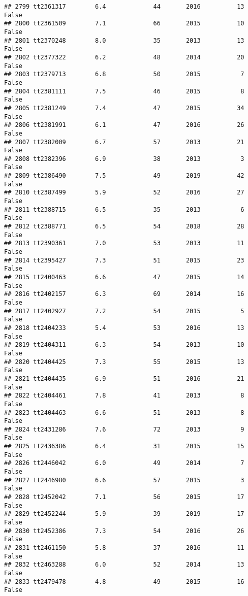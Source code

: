 \documentclass[
]{article}
\begin{document}
\begin{verbatim}
## 2799 tt2361317        6.4             44       2016          13   False
## 2800 tt2361509        7.1             66       2015          10   False
## 2801 tt2370248        8.0             35       2013          13   False
## 2802 tt2377322        6.2             48       2014          20   False
## 2803 tt2379713        6.8             50       2015           7   False
## 2804 tt2381111        7.5             46       2015           8   False
## 2805 tt2381249        7.4             47       2015          34   False
## 2806 tt2381991        6.1             47       2016          26   False
## 2807 tt2382009        6.7             57       2013          21   False
## 2808 tt2382396        6.9             38       2013           3   False
## 2809 tt2386490        7.5             49       2019          42   False
## 2810 tt2387499        5.9             52       2016          27   False
## 2811 tt2388715        6.5             35       2013           6   False
## 2812 tt2388771        6.5             54       2018          28   False
## 2813 tt2390361        7.0             53       2013          11   False
## 2814 tt2395427        7.3             51       2015          23   False
## 2815 tt2400463        6.6             47       2015          14   False
## 2816 tt2402157        6.3             69       2014          16   False
## 2817 tt2402927        7.2             54       2015           5   False
## 2818 tt2404233        5.4             53       2016          13   False
## 2819 tt2404311        6.3             54       2013          10   False
## 2820 tt2404425        7.3             55       2015          13   False
## 2821 tt2404435        6.9             51       2016          21   False
## 2822 tt2404461        7.8             41       2013           8   False
## 2823 tt2404463        6.6             51       2013           8   False
## 2824 tt2431286        7.6             72       2013           9   False
## 2825 tt2436386        6.4             31       2015          15   False
## 2826 tt2446042        6.0             49       2014           7   False
## 2827 tt2446980        6.6             57       2015           3   False
## 2828 tt2452042        7.1             56       2015          17   False
## 2829 tt2452244        5.9             39       2019          17   False
## 2830 tt2452386        7.3             54       2016          26   False
## 2831 tt2461150        5.8             37       2016          11   False
## 2832 tt2463288        6.0             52       2014          13   False
## 2833 tt2479478        4.8             49       2015          16   False

\end{verbatim}
\end{document}
